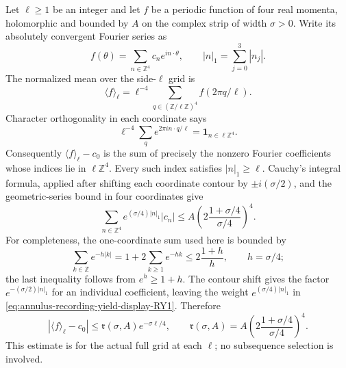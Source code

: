 Let $\ell\geq1$ be an integer and let $f$ be a periodic function of four
real momenta, holomorphic and bounded by $A$ on the complex strip of width
$\sigma>0$. Write its absolutely convergent Fourier series as
\[
 f(\theta)=\sum_{n\in\mathbb Z^4}c_n e^{i n\cdot\theta},
 \qquad |n|_1=\sum_{j=0}^3|n_j|.
\]
The normalized mean over the side-$\ell$ grid is
\[
 \langle f\rangle_\ell
   =\ell^{-4}\sum_{q\in(\mathbb Z/\ell\mathbb Z)^4}
                       f(2\pi q/\ell).
\]
Character orthogonality in each coordinate says
\[
 \ell^{-4}\sum_q e^{2\pi i n\cdot q/\ell}
       =\mathbf 1_{n\in\ell\mathbb Z^4}.
\]
Consequently $\langle f\rangle_\ell- c_0$ is the sum of precisely the
nonzero Fourier coefficients whose indices lie in $\ell\mathbb Z^4$.
Every such index satisfies $|n|_1\geq\ell$. Cauchy's integral formula,
applied after shifting each coordinate contour by $\pm i(\sigma/2)$,
and the geometric-series bound in four coordinates give
\begin{equation}
 \sum_{n\in\mathbb Z^4}e^{(\sigma/4)|n|_1}|c_n|
 \leq A\left(2\frac{1+\sigma/4}{\sigma/4}\right)^4.
 \label{eq:annulus-recording-yield-display-RY1}
\end{equation}
For completeness, the one-coordinate sum used here is bounded by
\[
 \sum_{k\in\mathbb Z}e^{-h|k|}
 =1+2\sum_{k\geq1}e^{-hk}
 \leq 2\frac{1+h}{h},\qquad h=\sigma/4;
\]
the last inequality follows from $e^h\geq1+h$. The contour shift gives
the factor $e^{-(\sigma/2)|n|_1}$ for an individual coefficient, leaving
the weight $e^{(\sigma/4)|n|_1}$ in \eqref{eq:annulus-recording-yield-display-RY1}. Therefore
\begin{equation}
 |\langle f\rangle_\ell-c_0|
 \leq \mathfrak r(\sigma,A)e^{-\sigma\ell/4},\qquad
 \mathfrak r(\sigma,A)
   =A\left(2\frac{1+\sigma/4}{\sigma/4}\right)^4.
 \label{eq:annulus-recording-yield-display-RY2}
\end{equation}
This estimate is for the actual full grid at each $\ell$; no subsequence
selection is involved.

